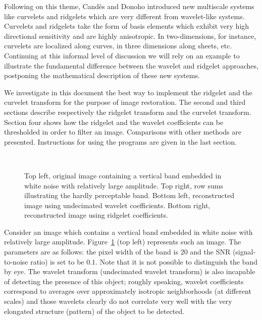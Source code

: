 Following on this theme, Cand\`es and Donoho in\-tro\-du\-ced new mul\-ti\-scale
systems like curvelets \cite{Curvelets-StMalo} and ridgelets \cite{Harmnet}
which are very different from wavelet-like systems. Curvelets and
ridgelets take the form of basis elements which exhibit very high
directional sensitivity and are highly anisotropic.  In
two-dimensions, for instance, curvelets are localized along curves, in
three dimensions along sheets, etc.  Continuing at this informal level
of discussion we will rely on an example to illustrate the fundamental
difference between the wavelet and ridgelet approaches, postponing
the mathematical description of these new systems.

We investigate in this document the best way to implement 
the ridgelet and the curvelet transform for the purpose of image restoration.
The second and third sections describe respectively
the ridgelet transform and the curvelet transform.
Section four shows how the ridgelet and the wavelet coefficients can be
thresholded in order to filter an image. Comparisons with other methods
are presented. Instructions for using the programs are given in the last 
section.

\begin{figure}[htb]
\centerline{
\vbox{
\hbox{
}
\hbox{
}}}
\caption{Top left, original image containing a vertical band embedded in 
white noise with relatively large amplitude.  Top right, row sums 
illustrating the hardly perceptable band.  Bottom left,
reconstructed image using undecimated wavelet coefficients. Bottom right,
reconstructed image using ridgelet coefficients.}
\label{fig_bar}
\end{figure}

Consider an image which contains a vertical band embedded in white
noise with relatively large amplitude.  Figure~\ref{fig_bar} (top
left) represents such an image.  The parameters are as follows: the
pixel width of the band is 20 and the SNR (signal-to-noise ratio)
is set to be $0.1$. Note
that it is not possible to distinguish the band by eye. The wavelet
transform (undecimated wavelet transform) is also incapable of
detecting the presence of this object; roughly speaking, wavelet
coefficients correspond to averages over approximately isotropic
neighborhoods (at different scales) and those wavelets clearly do not
correlate very well with the very elongated structure (pattern) of
the object to be detected.

